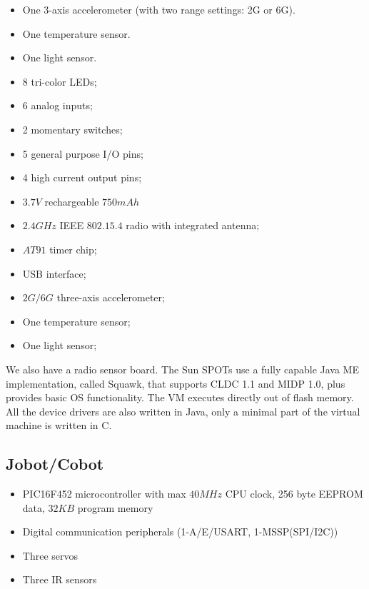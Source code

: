 \documentclass[a4paper,10pt]{article} %
\begin{document}
\begin{itemize}
    \item One 3-axis accelerometer (with two range settings: 2G or 6G).
    \item One temperature sensor.
    \item One light sensor.
    \item 8 tri-color LEDs;
    \item 6 analog inputs;
    \item 2 momentary switches;
    \item 5 general purpose I/O pins;
    \item 4 high current output pins;    
    \item $3.7V$ rechargeable $750 mAh$
    \item $2.4 GHz$ IEEE $802.15.4$ radio with integrated antenna;
    \item $AT91$ timer chip;
    \item USB interface;
    \item $2G/6G$ three-axis accelerometer;
    \item One temperature sensor;
    \item One light sensor;    
\end{itemize}

We also have a radio sensor board. The Sun SPOTs use a fully capable Java ME
implementation, called Squawk, that supports CLDC 1.1 and MIDP 1.0, plus
provides basic OS functionality. The VM executes directly out of flash memory.
All the device drivers are also written in Java, only a minimal part of the
virtual machine is written in C.


\subsection{Jobot/Cobot} %
\label{app:cobot}

\begin{itemize}
    \item PIC16F452 microcontroller with max $40MHz$ CPU clock, 256 byte
    EEPROM data, $32KB$ program memory
    \item Digital communication peripherals (1-A/E/USART, 1-MSSP(SPI/I2C))
    \item Three servos
    \item Three IR sensors
\end{itemize}
\end{document}
